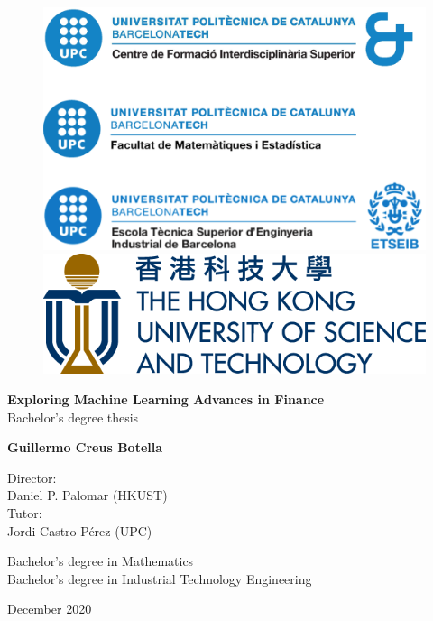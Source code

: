 \begin{titlepage}
	\begin{center}
		\begin{figure}[htbp]
			\centering
			\begin{minipage}{.6\textwidth}
				\centering
				\includegraphics[width=.8\textwidth]{img/all_logos}
			\end{minipage}%
			\begin{minipage}{.4\textwidth}
				\centering
				\includegraphics[width=.8\textwidth]{img/logo_HKUST}
			\end{minipage}
		\end{figure}	  
	  
	  \vspace*{1cm}
	  
	  \Huge
	  \textbf{Exploring Machine Learning Advances in Finance}\\[1.25ex]
	
	  
	  \vspace{.5cm}
	  \LARGE
	  Bachelor's degree thesis	
	
	  \vspace{1.5cm}
	  \textbf{Guillermo Creus Botella}
	  
	  \vfill	  
	  
	  Director:\\
	  Daniel P. Palomar (HKUST)\\
	  
	  \vspace{.5cm}
	  Tutor:\\
	  Jordi Castro Pérez (UPC)
	  
	  
	  \vfill	  
	  \Large
	  Bachelor's degree in Mathematics\\
	  Bachelor's degree in Industrial Technology Engineering
	  
	  \vspace{.5cm}	  
	  December 2020

	\end{center}
\end{titlepage}